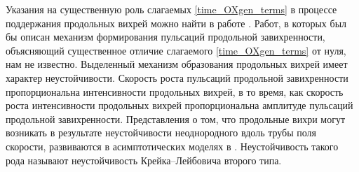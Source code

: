 Указания на существенную роль слагаемых \eqref{time_OXgen_terms} в процессе поддержания продольных вихрей можно найти в работе \cite{Hamilton1995}. Работ, в которых был бы описан механизм формирования пульсаций продольной завихренности, объясняющий существенное отличие слагаемого \eqref{time_OXgen_terms} от нуля, нам не известно. Выделенный механизм образования продольных вихрей имеет характер неустойчивости. Скорость роста пульсаций продольной завихренности пропорциональна интенсивности продольных вихрей, в то время, как скорость роста интенсивности продольных вихрей пропорциональна амплитуде пульсаций продольной завихренности. Представления о том, что продольные вихри могут возникать в результате неустойчивости неоднородного вдоль трубы поля скорости, развиваются в асимптотических моделях в \cite{Craik1977, Hall2010}. Неустойчивость такого рода называют неустойчивость Крейка--Лейбовича второго типа. 


